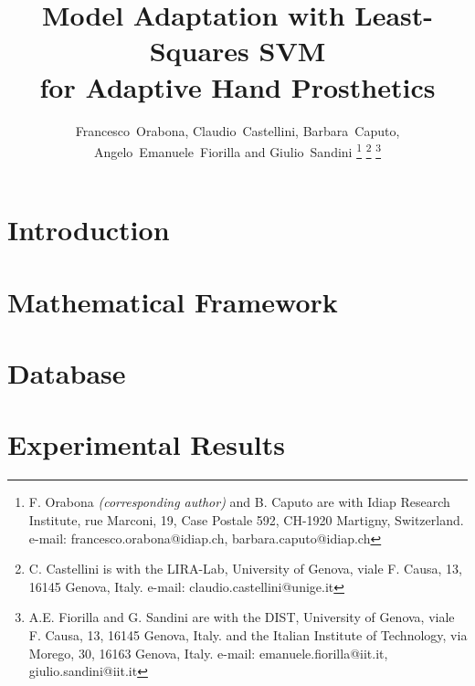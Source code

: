 \documentclass[conference,letterpaper,10pt]{ieeeconf}
\begin{document}

\title{Model Adaptation with Least-Squares SVM\\for Adaptive Hand Prosthetics}

\author{Francesco~Orabona, Claudio~Castellini, Barbara~Caputo, Angelo~Emanuele~Fiorilla and Giulio~Sandini%
\thanks{F. Orabona \emph{(corresponding author)} and B. Caputo
  are with Idiap Research Institute,
  rue Marconi, 19, Case Postale 592, CH-1920 Martigny, Switzerland.
  e-mail: francesco.orabona@idiap.ch, barbara.caputo@idiap.ch}%
\thanks{C. Castellini
  is with the LIRA-Lab, University of Genova,
  viale F. Causa, 13, 16145 Genova, Italy.
  e-mail: claudio.castellini@unige.it}%
\thanks{A.E. Fiorilla and G. Sandini
  are with the DIST, University of Genova,
  viale F. Causa, 13, 16145 Genova, Italy.
  and the Italian Institute of Technology,
  via Morego, 30, 16163 Genova, Italy.
  e-mail: emanuele.fiorilla@iit.it, giulio.sandini@iit.it}%
}

\maketitle
\thispagestyle{empty}
\pagestyle{empty}

\begin{abstract}
  
\end{abstract}


\section{Introduction}
\label{sec:intro}


%

\section{Mathematical Framework}
\label{sec:math}


\section{Database}
\label{sec:mms}


\section{Experimental Results}
\label{sec:exp}

\end{document}
